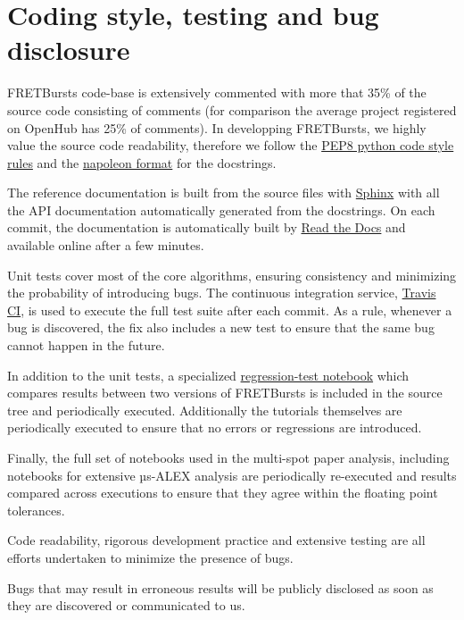 \section{Coding style, testing and bug disclosure}

FRETBursts code-base is extensively commented with more that 35\%
of the source code consisting of comments (for comparison the average project
registered on OpenHub has 25\% of comments).
In developping FRETBursts, we highly value the source code readability,
therefore we follow the
\href{https://www.python.org/dev/peps/pep-0008/}{PEP8 python code style rules} and
the \href{http://sphinxcontrib-napoleon.readthedocs.org/}{napoleon format}
for the docstrings.

The reference documentation is built from the source files with \href{http://sphinx-doc.org/}{Sphinx} with
all the API documentation automatically generated from the docstrings.
On each commit, the documentation is automatically built by
\href{https://readthedocs.org/}{Read the Docs}
and available online after a few minutes.

Unit tests cover most of the core algorithms, ensuring consistency and
minimizing the probability of introducing bugs. The continuous integration
service, \href{http://travis-ci.org}{Travis CI}, is used to execute the full
test suite after each commit.
As a rule, whenever a bug is discovered, the  fix also includes a new test
to ensure that the same bug cannot happen in the future.

In addition to the unit tests, a specialized
\href{https://github.com/tritemio/FRETBursts/blob/master/notebooks/dev/tests/FRETBursts\%20-\%20Regression\%20tests.ipynb}{regression-test notebook}
which compares results between two versions of FRETBursts is
included in the source tree and periodically executed. Additionally
the tutorials themselves are periodically executed to ensure that
no errors or regressions are introduced.

Finally, the full set of notebooks used in the multi-spot paper analysis,
including notebooks for extensive µs-ALEX analysis are periodically
re-executed and results compared across executions to ensure that
they agree within the floating point tolerances.

Code readability, rigorous development practice and extensive testing
are all efforts undertaken to minimize the presence of bugs.

Bugs that may result in erroneous results will be publicly disclosed as soon as
they are discovered or communicated to us.
